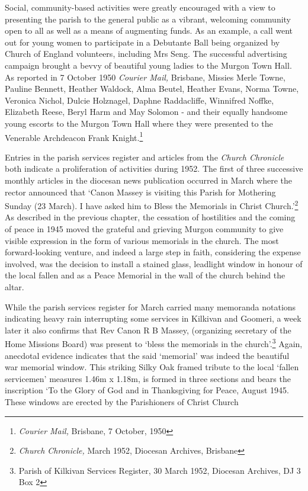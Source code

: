 Social, community-based activities were greatly encouraged with a view to presenting the parish to the general public as a vibrant, welcoming community open to all as well as a means of augmenting funds. As an example, a call went out for young women to participate in a Debutante Ball being organized by Church of England volunteers, including Mrs Seng. The successful advertising campaign brought a bevvy of beautiful young ladies to the Murgon Town Hall. As reported in 7 October 1950 \emph{Courier Mail,} Brisbane, Missies Merle Towne, Pauline Bennett, Heather Waldock, Alma Beutel, Heather Evans, Norma Towne, Veronica Nichol, Dulcie Holznagel, Daphne Raddacliffe, Winnifred Noffke, Elizabeth Reese, Beryl Harm and May Solomon - and their equally handsome young escorts to the Murgon Town Hall where they were presented to the Venerable Archdeacon Frank Knight.\footnote{\emph{Courier Mail,} Brisbane, 7 October, 1950}


Entries in the parish services register and articles from the \emph{Church Chronicle} both indicate a proliferation of activities during 1952. The first of three successive monthly articles in the diocesan news publication occurred in March where the rector announced that `Canon Massey is visiting this Parish for Mothering Sunday (23 March). I have asked him to Bless the Memorials in Christ Church.'\footnote{\emph{Church Chronicle,} March 1952, Diocesan Archives, Brisbane} As described in the previous chapter, the cessation of hostilities and the coming of peace in 1945 moved the grateful and grieving Murgon community to give visible expression in the form of various memorials in the church. The most forward-looking venture, and indeed a large step in faith, considering the expense involved, was the decision to install a stained glass, leadlight window in honour of the local fallen and as a Peace Memorial in the wall of the church behind the altar.


While the parish services register for March carried many memoranda notations indicating heavy rain interrupting some services in Kilkivan and Goomeri, a week later it also confirms that Rev Canon R B Massey, (organizing secretary of the Home Missions Board) was present to `bless the memorials in the church'.\footnote{Parish of Kilkivan Services Register, 30 March 1952, Diocesan Archives, DJ 3 Box 2} Again, anecdotal evidence indicates that the said `memorial' was indeed the beautiful war memorial window. This striking Silky Oak framed tribute to the local `fallen servicemen' measures 1.46m x 1.18m, is formed in three sections and bears the inscription `To the Glory of God and in Thanksgiving for Peace, August 1945. These windows are erected by the Parishioners of Christ Church


